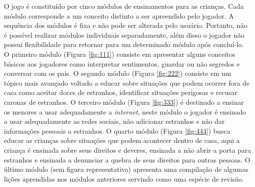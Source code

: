 O jogo é constituído por cinco módulos de ensinamentos para as crianças. Cada módulo corresponde a um conceito distinto a ser apreendido pelo jogador. A sequência dos módulos é fixa e não pode ser alterada pelo usuário. Portanto, não é possível realizar módulos individuais separadamente, além disso o jogador não possui flexibilidade para retornar para um determinado módulo após concluí-lo. O primeiro módulo (Figura \ref{fig:111}) consiste em apresentar alguns conceitos básicos aos jogadores como interpretar sentimentos, guardar ou não segredos e conversar com os pais. O segundo módulo (Figura \ref{fig:222}) consiste em um tópico mais avançado voltado a educar sobre situações que podem ocorrer fora de casa como aceitar doces de estranhos, identificar situações perigosas e recusar caronas de estranhos. O terceiro módulo (Figura \ref{fig:333}) é destinado a ensinar os menores a usar adequadamente a \textit{internet}, neste módulo o jogador é ensinado a usar adequadamente as redes sociais, não adicionar estranhos e não dar informações pessoais a estranhos. O quarto módulo (Figura \ref{fig:444}) busca educar as crianças sobre situações que podem acontecer dentro de casa, aqui a criança é ensinada sobre seus direitos e deveres, ensinada a não abrir a porta para estranhos e ensinada a denunciar a quebra de seus direitos para outras pessoas. O último módulo (sem figura representativa) apresenta uma compilação de algumas lições aprendidas nos módulos anteriores servindo como uma espécie de revisão. 

